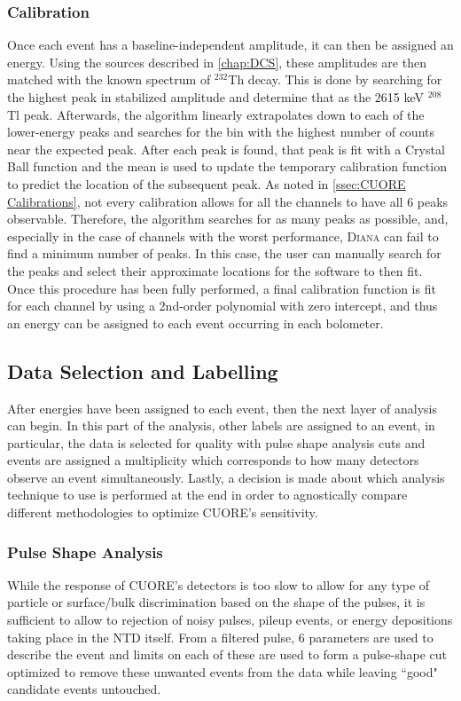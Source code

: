 \subsubsection{Calibration}
\label{ssec:Calibration}
Once each event has a baseline-independent amplitude, it can then be assigned an energy.
Using the sources described in \autoref{chap:DCS}, these amplitudes are then matched with the known spectrum of $^{232}$Th decay.
This is done by searching for the highest peak in stabilized amplitude and determine that as the 2615 keV $^{208}$Tl peak.
Afterwards, the algorithm linearly extrapolates down to each of the lower-energy peaks and searches for the bin with the highest number of counts near the expected peak.
After each peak is found, that peak is fit with a Crystal Ball function and the mean is used to update the temporary calibration function to predict the location of the subsequent peak.
As noted in \autoref{ssec:CUORE Calibrations}, not every calibration allows for all the channels to have all 6 peaks observable.
Therefore, the algorithm searches for as many peaks as possible, and, especially in the case of channels with the worst performance, \textsc{Diana} can fail to find a minimum number of peaks.
In this case, the user can manually search for the peaks and select their approximate locations for the software to then fit.
Once this procedure has been fully performed, a final calibration function is fit for each channel by using a 2nd-order polynomial with zero intercept, and thus an energy can be assigned to each event occurring in each bolometer.

\subsection*{Data Selection and Labelling}
After energies have been assigned to each event, then the next layer of analysis can begin.
In this part of the analysis, other labels are assigned to an event, in particular, the data is selected for quality with pulse shape analysis cuts and events are assigned a multiplicity which corresponds to how many detectors observe an event simultaneously.
Lastly, a decision is made about which analysis technique to use is performed at the end in order to agnostically compare different methodologies to optimize CUORE's sensitivity.

\subsubsection*{Pulse Shape Analysis}
While the response of CUORE's detectors is too slow to allow for any type of particle or surface/bulk discrimination based on the shape of the pulses, it is sufficient to allow to rejection of noisy pulses, pileup events, or energy depositions taking place in the NTD itself.
From a filtered pulse, 6 parameters are used to describe the event and limits on each of these are used to form a pulse-shape cut optimized to remove these unwanted events from the data while leaving ``good" candidate events untouched.

